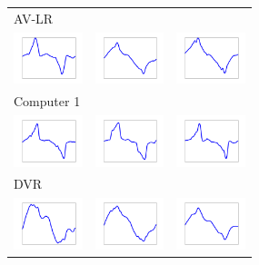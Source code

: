 \begin{table}[]
\setlength{\tabcolsep}{3pt}
\centering
\begin{tabular}{lcc}
\hline
AV-LR  \\
 \includegraphics[width=20mm]{comps/comp_all63.pdf}        & \includegraphics[width=20mm]{comps/comp_all49.pdf}       & \includegraphics[width=20mm]{comps/comp_all23.pdf}   \\ \hline
Computer 1     \\
 \includegraphics[width=20mm]{comps/comp_all30.pdf}        & \includegraphics[width=20mm]{comps/comp_all60.pdf}       & \includegraphics[width=20mm]{comps/comp_all18.pdf}   \\ \hline
DVR            \\
\includegraphics[width=20mm]{comps/comp_all34.pdf}        & \includegraphics[width=20mm]{comps/comp_all82.pdf}       & \includegraphics[width=20mm]{comps/comp_all47.pdf}   \\ \hline


\end{tabular}
\end{table}
